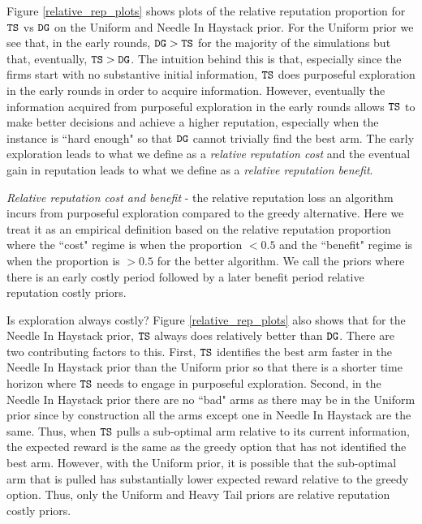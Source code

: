\documentclass[../competing_bandits.tex]{subfiles}
\begin{document}
{\begin{figure}[ht]
\end{figure}



Figure \ref{relative_rep_plots} shows plots of the relative reputation proportion for $\mathtt{TS}$ vs $\mathtt{DG}$ on the Uniform and Needle In Haystack prior. For the Uniform prior we see that, in the early rounds, $\mathtt{DG} > \mathtt{TS}$ for the majority of the simulations but that, eventually, $\mathtt{TS} > \mathtt{DG}$. The intuition behind this is that, especially since the firms start with no substantive initial information, $\mathtt{TS}$ does purposeful exploration in the early rounds in order to acquire information. However, eventually the information acquired from purposeful exploration in the early rounds allows $\mathtt{TS}$ to make better decisions and achieve a higher reputation, especially when the instance is ``hard enough" so that $\mathtt{DG}$ cannot trivially find the best arm. The early exploration leads to what we define as a \textit{relative reputation cost} and the eventual gain in reputation leads to what we define as a \textit{relative reputation benefit}.



\begin{definition}
\textit{Relative reputation cost and benefit} - the relative reputation loss an algorithm incurs from purposeful exploration compared to the greedy alternative. Here we treat it as an empirical definition based on the relative reputation proportion where the ``cost" regime is when the proportion $< 0.5$ and the ``benefit" regime is when the proportion is $> 0.5$ for the better algorithm. We call the priors where there is an early costly period followed by a later benefit period relative reputation costly priors.
\end{definition}
Is exploration always costly? Figure \ref{relative_rep_plots} also shows that for the Needle In Haystack prior, $\mathtt{TS}$ always does relatively better than $\mathtt{DG}$. There are two contributing factors to this. First, $\mathtt{TS}$ identifies the best arm faster in the Needle In Haystack prior than the Uniform prior so that there is a shorter time horizon where $\mathtt{TS}$ needs to engage in purposeful exploration. Second, in the Needle In Haystack prior there are no ``bad" arms as there may be in the Uniform prior since by construction all the arms except one in Needle In Haystack are the same. Thus, when $\mathtt{TS}$ pulls a sub-optimal arm relative to its current information, the expected reward is the same as the greedy option that has not identified the best arm. However, with the Uniform prior, it is possible that the sub-optimal arm that is pulled has substantially lower expected reward relative to the greedy option. Thus, only the Uniform and Heavy Tail priors are relative reputation costly priors.

}
\end{document}
